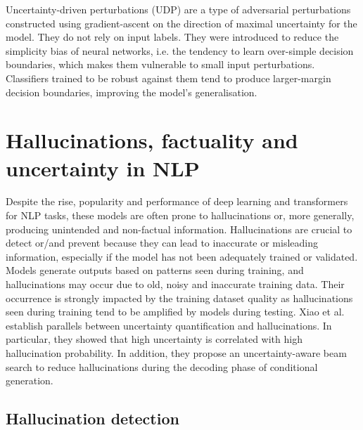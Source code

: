 Uncertainty-driven perturbations\cite{UDP} (UDP) are a type of adversarial perturbations constructed using gradient-ascent on the direction of maximal uncertainty for the model. They do not rely on input labels. They were introduced to reduce the simplicity bias of neural networks, i.e. the tendency to learn over-simple decision boundaries, which makes them vulnerable to small input perturbations. Classifiers trained to be robust against them tend to produce larger-margin decision boundaries, improving the model's generalisation.


\section{Hallucinations, factuality and uncertainty in NLP}



Despite the rise, popularity and performance of deep learning and transformers for NLP tasks, these models are often prone to hallucinations or, more generally, producing unintended and non-factual information. Hallucinations are crucial to detect or/and prevent because they can lead to inaccurate or misleading information, especially if the model has not been adequately trained or validated. Models generate outputs based on patterns seen during training, and hallucinations may occur due to old, noisy and inaccurate training data. Their occurrence is strongly impacted by the training dataset quality as hallucinations seen during training tend to be amplified by models during testing\cite{originHalluDataOrModel}. 
Xiao et al.\cite{hallucinationUQWang} establish parallels between uncertainty quantification and hallucinations. In particular, they showed that high uncertainty is correlated with high hallucination probability. In addition, they propose an uncertainty-aware beam search to reduce hallucinations during the decoding phase of conditional generation. 

\subsection{Hallucination detection}

